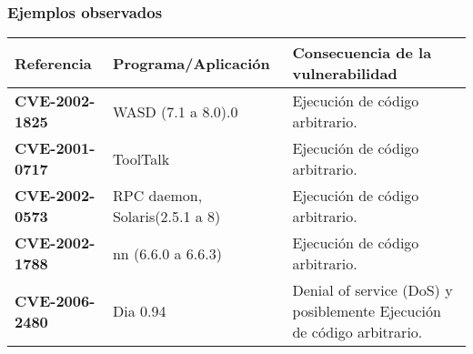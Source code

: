 \subsubsection{Ejemplos observados}

\begin{tabular}[\baselineskip]{|p{1.75cm}|p{3.5cm}|p{8cm}|}
  \hline
  \textbf{Referencia} & Programa/Aplicación & Consecuencia de la vulnerabilidad \\
  \hline
  \textbf{CVE-2002-1825} & WASD (7.1 a 8.0).0 & Ejecución de código arbitrario. \\
  \hline
  \textbf{CVE-2001-0717} & ToolTalk & Ejecución de código arbitrario. \\
  \hline
  \textbf{CVE-2002-0573} & RPC daemon, Solaris(2.5.1 a 8) & Ejecución de código arbitrario. \\
  \hline
  \textbf{CVE-2002-1788} & nn (6.6.0 a 6.6.3)  & Ejecución de código arbitrario.\\
  \hline
  \textbf{CVE-2006-2480} &  Dia 0.94  & Denial of service (DoS) y posiblemente Ejecución de código arbitrario.\\
  \hline
\end{tabular}

